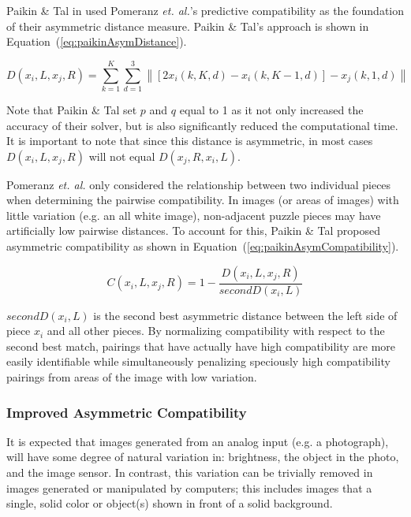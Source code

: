 \documentclass{report}
\def\eref#1{(\ref{#1})}
\newcommand{\norm}[1]{\left\lVert#1\right\rVert}
\begin{document}
Paikin \& Tal in \cite{paikin2015} used Pomeranz \textit{et. al.}'s predictive compatibility as the foundation of their asymmetric distance measure.  Paikin \& Tal's approach is shown in Equation~\eref{eq:paikinAsymDistance}.

\begin{equation} \label{eq:paikinAsymDistance}
D(x_i,L,x_j,R) = \sum_{k=1}^{K}\sum_{d=1}^{3} \norm{[2x_i(k, K, d) - x_i(k, K-1, d)] - x_j(k, 1, d)}
\end{equation}

Note that Paikin \& Tal set $p$ and $q$ equal to 1 as it not only increased the accuracy of their solver, but is also significantly reduced the computational time.  It is important to note that since this distance is asymmetric, in most cases $D(x_i,L,x_j,R)$ will not equal $D(x_j,R,x_i,L)$.

Pomeranz \textit{et. al.} only considered the relationship between two individual pieces when determining the pairwise compatibility.  In images (or areas of images) with little variation (e.g. an all white image), non-adjacent puzzle pieces may have artificially low pairwise distances.  To account for this, Paikin \& Tal proposed asymmetric compatibility as shown in Equation~\eref{eq:paikinAsymCompatibility}.

\begin{equation} \label{eq:paikinAsymCompatibility}
C(x_i,L,x_j,R) = 1 - \frac{D(x_i,L,x_j,R)}{secondD(x_i,L)}
\end{equation}

\noindent
$secondD(x_i,L)$ is the second best asymmetric distance between the left side of piece $x_i$ and all other pieces.  By normalizing compatibility with respect to the second best match, pairings that have actually have high compatibility are more easily identifiable while simultaneously penalizing speciously high compatibility pairings from areas of the image with low variation.

\subsubsection{Improved Asymmetric Compatibility}\label{sec:hammoudehPairwiseAffinity}

It is expected that images generated from an analog input (e.g. a photograph), will have some degree of natural variation in: brightness, the object in the photo, and the image sensor.  In contrast, this variation can be trivially removed in images generated or manipulated by computers; this includes images that a single, solid color or object(s) shown in front of a solid background.
\end{document}
